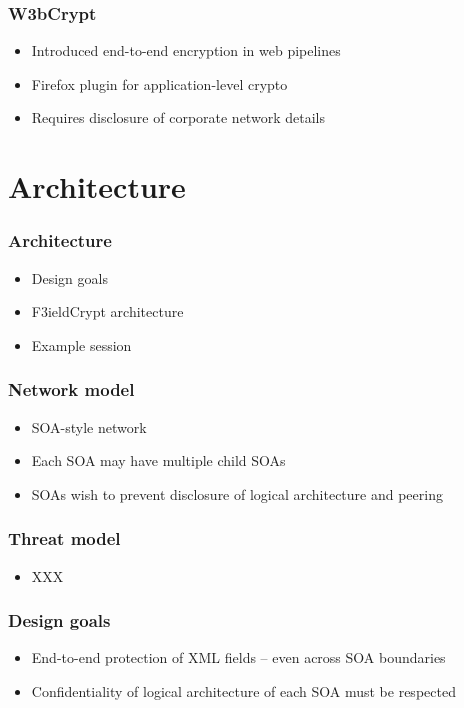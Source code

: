 \documentclass{beamer}
\begin{document}
\begin{frame}
\frametitle{W3bCrypt}
\begin{itemize}
\item Introduced end-to-end encryption in web pipelines
\item Firefox plugin for application-level crypto
\item Requires disclosure of corporate network details
\end{itemize}
\end{frame}

\section{Architecture}
\begin{frame}
\frametitle{Architecture}
\begin{itemize}
\item Design goals
\item F3ieldCrypt architecture
\item Example session
\end{itemize}
\end{frame}

\begin{frame}
\frametitle{Network model}
\begin{itemize}
\item SOA-style network
\item Each SOA may have multiple child SOAs
\item SOAs wish to prevent disclosure of logical architecture and peering 
\end{itemize}
\end{frame}

\begin{frame}
\frametitle{Threat model}
\begin{itemize}
\item XXX
\end{itemize}
\end{frame}

\begin{frame}
\frametitle{Design goals}
\begin{itemize}
\item End-to-end protection of XML fields -- even across SOA boundaries
\item Confidentiality of logical architecture of each SOA must be respected
\end{itemize}
\end{frame}
\end{document}
